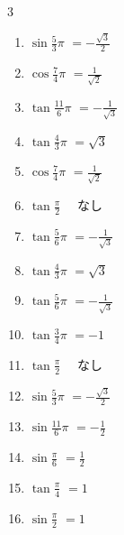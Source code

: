 \begin{multicols}{3}
\begin{enumerate}
  \item $\displaystyle \sin{\frac{5}{3}\pi}$
        $\displaystyle =-\frac{\sqrt{3}}{2}$

  \item $\displaystyle \cos{\frac{7}{4}\pi}$
        $\displaystyle =\frac{1}{\sqrt{2}}$

  \item $\displaystyle \tan{\frac{11}{6}\pi}$
        $\displaystyle =-\frac{1}{\sqrt{3}}$

  \item $\displaystyle \tan{\frac{4}{3}\pi}$
        $\displaystyle =\sqrt{3}$

  \item $\displaystyle \cos{\frac{7}{4}\pi}$
        $\displaystyle =\frac{1}{\sqrt{2}}$

  \item $\displaystyle \tan{\frac{\pi}{2}}$
        $\displaystyle \quad なし$

  \item $\displaystyle \tan{\frac{5}{6}\pi}$
        $\displaystyle =-\frac{1}{\sqrt{3}}$

  \item $\displaystyle \tan{\frac{4}{3}\pi}$
        $\displaystyle =\sqrt{3}$

  \item $\displaystyle \tan{\frac{5}{6}\pi}$
        $\displaystyle =-\frac{1}{\sqrt{3}}$

\columnbreak %

  \item $\displaystyle \tan{\frac{3}{4}\pi}$
        $\displaystyle =-1$

  \item $\displaystyle \tan{\frac{\pi}{2}}$
        $\displaystyle \quad なし$

  \item $\displaystyle \sin{\frac{5}{3}\pi}$
        $\displaystyle =-\frac{\sqrt{3}}{2}$

  \item $\displaystyle \sin{\frac{11}{6}\pi}$
        $\displaystyle =-\frac{1}{2}$

  \item $\displaystyle \sin{\frac{\pi}{6}}$
        $\displaystyle =\frac{1}{2}$

  \item $\displaystyle \tan{\frac{\pi}{4}}$
        $\displaystyle =1$

  \item $\displaystyle \sin{\frac{\pi}{2}}$
        $\displaystyle =1$


\end{enumerate}
\end{multicols}
